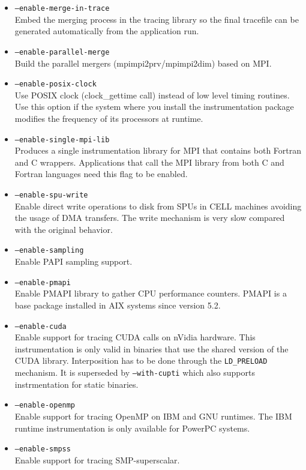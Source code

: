 \begin{itemize}
	\item {\tt --enable-merge-in-trace} \\
	Embed the merging process in the tracing library so the final tracefile can be generated automatically from the application run.
	\item {\tt --enable-parallel-merge} \\
	Build the parallel mergers (mpimpi2prv/mpimpi2dim) based on MPI.
	\item {\tt --enable-posix-clock} \\
	Use POSIX clock (clock\_gettime call) instead of low level timing routines. Use this option if the system where you install the instrumentation package modifies the frequency of its processors at runtime.
	\item {\tt --enable-single-mpi-lib} \\
	Produces a single instrumentation library for MPI that contains both Fortran and C wrappers. Applications that call the MPI library from both C and Fortran languages need this flag to be enabled.
	\item {\tt --enable-spu-write} \\
	Enable direct write operations to disk from SPUs in CELL machines avoiding the usage of DMA transfers. The write mechanism is very slow compared with the original behavior.
	\item {\tt --enable-sampling} \\
	Enable PAPI sampling support.
	\item {\tt --enable-pmapi} \\
	Enable PMAPI library to gather CPU performance counters. PMAPI is a base package installed in AIX systems since version 5.2.
	\item {\tt --enable-cuda} \\
	Enable support for tracing CUDA calls on nVidia hardware. This instrumentation is only valid in binaries that use the shared version of the CUDA library. Interposition has to be done through the {\tt LD\_PRELOAD} mechanism. It is superseded by {\tt --with-cupti} which also supports instrmentation for static binaries.
	\item {\tt --enable-openmp} \\
	Enable support for tracing OpenMP on IBM and GNU runtimes. The IBM runtime instrumentation is only available for PowerPC systems.
	\item {\tt --enable-smpss} \\
	Enable support for tracing SMP-superscalar.

\end{itemize}
